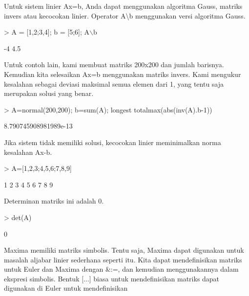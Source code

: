 \documentclass[a4paper,10pt]{article}
\begin{document}
\begin{eulernotebook}
\begin{eulercomment}
\begin{eulercomment}
\begin{eulercomment}
\begin{eulercomment}
\begin{eulercomment}
\begin{eulercomment}
\begin{eulercomment}
Untuk sistem linier Ax=b, Anda dapat menggunakan algoritma Gauss,
matriks invers atau kecocokan linier. Operator A\textbackslash{}b menggunakan versi
algoritma Gauss.
\end{eulercomment}
\begin{eulerprompt}
> A = [1,2;3,4]; b = [5;6]; A\(\backslash\)b
\end{eulerprompt}
\begin{euleroutput}
             -4 
            4.5 
\end{euleroutput}
\begin{eulercomment}
Untuk contoh lain, kami membuat matriks 200x200 dan jumlah barisnya.
Kemudian kita selesaikan Ax=b menggunakan matriks invers. Kami
mengukur kesalahan sebagai deviasi maksimal semua elemen dari 1, yang
tentu saja merupakan solusi yang benar.
\end{eulercomment}
\begin{eulerprompt}
> A=normal(200,200); b=sum(A); longest totalmax(abs(inv(A).b-1))
\end{eulerprompt}
\begin{euleroutput}
    8.790745908981989e-13 
\end{euleroutput}
\begin{eulercomment}
Jika sistem tidak memiliki solusi, kecocokan linier meminimalkan norma
kesalahan Ax-b.
\end{eulercomment}
\begin{eulerprompt}
> A=[1,2,3;4,5,6;7,8,9]
\end{eulerprompt}
\begin{euleroutput}
              1             2             3 
              4             5             6 
              7             8             9 
\end{euleroutput}
\begin{eulercomment}
Determinan matriks ini adalah 0.
\end{eulercomment}
\begin{eulerprompt}
> det(A)
\end{eulerprompt}
\begin{euleroutput}
  0
\end{euleroutput}
\begin{eulercomment}
Maxima memiliki matriks simbolis. Tentu saja, Maxima dapat digunakan
untuk masalah aljabar linier sederhana seperti itu. Kita dapat
mendefinisikan matriks untuk Euler dan Maxima dengan \&:=, dan kemudian
menggunakannya dalam ekspresi simbolis. Bentuk [...] biasa untuk
mendefinisikan matriks dapat digunakan di Euler untuk mendefinisikan

\end{eulercomment}
\end{eulercomment}
\end{eulercomment}
\end{eulercomment}
\end{eulercomment}
\end{eulercomment}
\end{eulercomment}
\end{eulernotebook}
\end{document}
